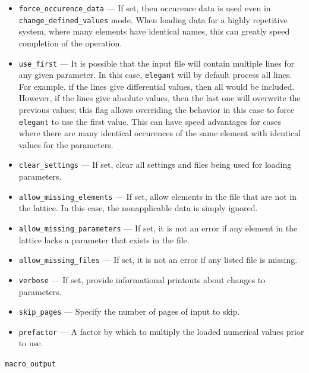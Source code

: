 \documentclass[11pt]{article}
\begin{document}
\begin{itemize}
\item \verb|force_occurence_data| --- If set, then occurence data is
used even in \verb|change_defined_values| mode. When loading data for
a highly repetitive system, where many elements have identical names, this can greatly
speed completion of the operation.

\item \verb|use_first| --- It is possible that the input file will contain
multiple lines for any given parameter.  In this case, {\tt elegant} will
by default process all lines.  For example, if the lines give differential values,
then all would be included. However, if the lines give absolute values, then the
last one will overwrite the previous values; this flag allows overriding the
behavior in this case to force {\tt elegant} to use the first value.
This can have speed advantages for cases where there are many identical
occurences of the same element with identical values for the parameters.

\item \verb|clear_settings| --- If set, clear all settings and files
being used for loading parameters.

\item \verb|allow_missing_elements| --- If set, allow elements in the
file that are not in the lattice.  In this case, the nonapplicable
data is simply ignored.

\item \verb|allow_missing_parameters| --- If set, it is not an error
if any element in the lattice lacks a parameter that exists in the file.

\item \verb|allow_missing_files| --- If set, it is not an error
if any listed file is missing.

\item \verb|verbose| --- If set, provide informational printouts about
changes to parameters.

\item \verb|skip_pages| --- Specify the number of pages of input to skip.

\item \verb|prefactor| --- A factor by which to multiply the loaded numerical values
  prior to use.
  
\end{itemize}


\newpage
\begin{center}{\Large\verb|macro_output|}\end{center}
\end{document}

